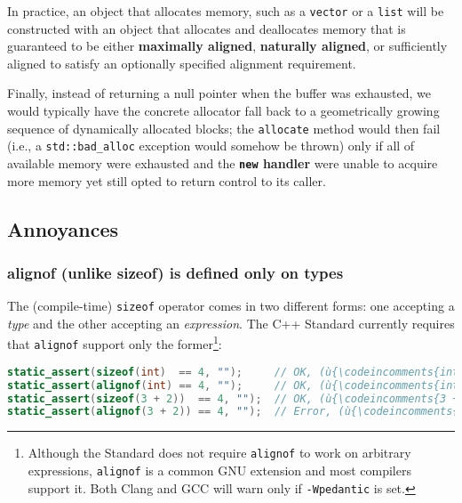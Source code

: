 \noindent In practice, an object that allocates memory, such as a \texttt{vector}
or a \texttt{list} will be constructed with an object that allocates and
deallocates memory that is guaranteed to be either \textbf{maximally
aligned}, \textbf{naturally aligned}, or sufficiently aligned to satisfy
an optionally specified alignment requirement.

Finally, instead of returning a null pointer when the buffer was
exhausted, we would typically have the concrete allocator fall back to a
geometrically growing sequence of dynamically allocated blocks; the
\texttt{allocate} method would then fail (i.e., a
\texttt{std::bad\_alloc} exception would somehow be thrown) only if all
of available memory were exhausted and the \textbf{\texttt{new} handler}
were unable to acquire more memory yet still opted to return control
to its caller.

\subsection[Annoyances]{Annoyances}\label{annoyances-alignof}

\subsubsection[\tt{alignof} (unlike \tt{sizeof}) is defined only on types]{{\SubsubsecCode alignof} (unlike {\SubsubsecCode sizeof}) is defined only on types}\label{alignof-(unlike-sizeof)-is-defined-only-on-types}

The (compile-time) \texttt{sizeof} operator comes in two different
forms: one accepting a \emph{type} and the other accepting an
\emph{expression}. The C++ Standard currently requires that
\texttt{alignof} support only the former{\cprotect\footnote{Although
the Standard does not require \texttt{alignof} to work on arbitrary
expressions, \texttt{alignof} is a common GNU extension and most compilers support
  it. Both Clang and GCC will warn only if \texttt{-Wpedantic} is set.}}:

\begin{lstlisting}[language=C++]
static_assert(sizeof(int)  == 4, "");     // OK, (ù{\codeincomments{int}}ù) is a type.
static_assert(alignof(int) == 4, "");     // OK, (ù{\codeincomments{int}}ù) is a type.
static_assert(sizeof(3 + 2))  == 4, "");  // OK, (ù{\codeincomments{3 + 2}}ù) is an expression.
static_assert(alignof(3 + 2)) == 4, "");  // Error, (ù{\codeincomments{3 + 2}}ù) is not a type.
\end{lstlisting}
    
